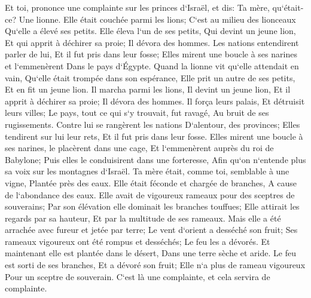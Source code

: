 \verse Et toi, prononce une complainte sur les princes d`Israël, 
\verse et dis: Ta mère, qu`était-ce? Une lionne. Elle était couchée parmi les lions; C`est au milieu des lionceaux Qu`elle a élevé ses petits. 
\verse Elle éleva l`un de ses petits, Qui devint un jeune lion, Et qui apprit à déchirer sa proie; Il dévora des hommes. 
\verse Les nations entendirent parler de lui, Et il fut pris dans leur fosse; Elles mirent une boucle à ses narines et l`emmenèrent Dans le pays d`Égypte. 
\verse Quand la lionne vit qu`elle attendait en vain, Qu`elle était trompée dans son espérance, Elle prit un autre de ses petits, Et en fit un jeune lion. 
\verse Il marcha parmi les lions, Il devint un jeune lion, Et il apprit à déchirer sa proie; Il dévora des hommes. 
\verse Il força leurs palais, Et détruisit leurs villes; Le pays, tout ce qui s`y trouvait, fut ravagé, Au bruit de ses rugissements. 
\verse Contre lui se rangèrent les nations D`alentour, des provinces; Elles tendirent sur lui leur rets, Et il fut pris dans leur fosse. 
\verse Elles mirent une boucle à ses narines, le placèrent dans une cage, Et l`emmenèrent auprès du roi de Babylone; Puis elles le conduisirent dans une forteresse, Afin qu`on n`entende plus sa voix sur les montagnes d`Israël. 
\verse Ta mère était, comme toi, semblable à une vigne, Plantée près des eaux. Elle était féconde et chargée de branches, A cause de l`abondance des eaux. 
\verse Elle avait de vigoureux rameaux pour des sceptres de souverains; Par son élévation elle dominait les branches touffues; Elle attirait les regards par sa hauteur, Et par la multitude de ses rameaux. 
\verse Mais elle a été arrachée avec fureur et jetée par terre; Le vent d`orient a desséché son fruit; Ses rameaux vigoureux ont été rompus et desséchés; Le feu les a dévorés. 
\verse Et maintenant elle est plantée dans le désert, Dans une terre sèche et aride. 
\verse Le feu est sorti de ses branches, Et a dévoré son fruit; Elle n`a plus de rameau vigoureux Pour un sceptre de souverain. C`est là une complainte, et cela servira de complainte. 

\chapter{}

